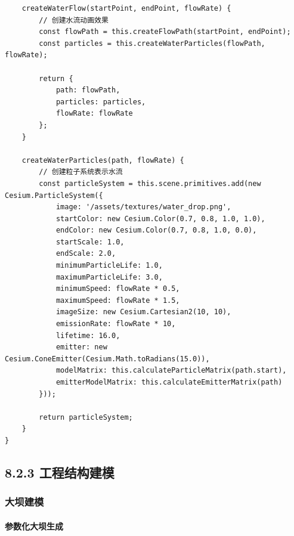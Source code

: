 \begin{lstlisting}
    createWaterFlow(startPoint, endPoint, flowRate) {
        // 创建水流动画效果
        const flowPath = this.createFlowPath(startPoint, endPoint);
        const particles = this.createWaterParticles(flowPath, flowRate);
        
        return {
            path: flowPath,
            particles: particles,
            flowRate: flowRate
        };
    }
    
    createWaterParticles(path, flowRate) {
        // 创建粒子系统表示水流
        const particleSystem = this.scene.primitives.add(new Cesium.ParticleSystem({
            image: '/assets/textures/water_drop.png',
            startColor: new Cesium.Color(0.7, 0.8, 1.0, 1.0),
            endColor: new Cesium.Color(0.7, 0.8, 1.0, 0.0),
            startScale: 1.0,
            endScale: 2.0,
            minimumParticleLife: 1.0,
            maximumParticleLife: 3.0,
            minimumSpeed: flowRate * 0.5,
            maximumSpeed: flowRate * 1.5,
            imageSize: new Cesium.Cartesian2(10, 10),
            emissionRate: flowRate * 10,
            lifetime: 16.0,
            emitter: new Cesium.ConeEmitter(Cesium.Math.toRadians(15.0)),
            modelMatrix: this.calculateParticleMatrix(path.start),
            emitterModelMatrix: this.calculateEmitterMatrix(path)
        }));
        
        return particleSystem;
    }
}
\end{lstlisting}

\subsection{8.2.3
工程结构建模}\label{ux5de5ux7a0bux7ed3ux6784ux5efaux6a21}

\subsubsection{大坝建模}\label{ux5927ux575dux5efaux6a21}

\paragraph{参数化大坝生成}\label{ux53c2ux6570ux5316ux5927ux575dux751fux6210}


